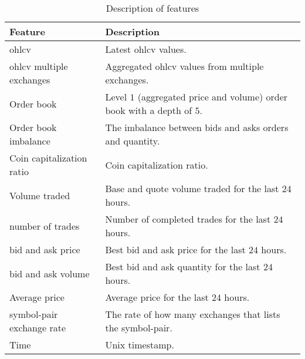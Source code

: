 \begin{table}[ht]
    \centering
    \begin{tabular}{p{} p{}}
        \hline
        \textbf{Feature} & \textbf{Description}\\
        \hline
        \ac{ohlcv}                      & Latest \ac{ohlcv} values.\\
        \hline
        \ac{ohlcv} multiple exchanges   & Aggregated \ac{ohlcv} values from multiple exchanges.\\
        \hline
        Order book                      & Level $1$ (aggregated price and volume) order book with a depth of $5$.\\
        \hline
        Order book imbalance            & The imbalance between bids and asks orders and quantity.\\
        \hline
        Coin capitalization ratio       & Coin capitalization ratio.\\
        \hline
        Volume traded                   & Base and quote volume traded for the last $24$ hours.\\
        \hline
        number of trades                & Number of completed trades for the last $24$ hours.\\      
        \hline
        bid and ask price               & Best bid and ask price for the last $24$ hours.\\
        \hline
        bid and ask volume              & Best bid and ask quantity for the last $24$ hours.\\
        \hline
        Average price                   & Average price for the last $24$ hours.\\
        \hline
        symbol-pair exchange rate       & The rate of how many exchanges that lists the symbol-pair.\\ 
        \hline
        Time                            & Unix timestamp.\\
        \hline
    \end{tabular}
    \caption{Description of features}
    \label{tab:features}
\end{table}
